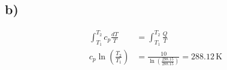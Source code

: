 

\subsection*{b)}

\begin{align*}
\int_{T_1}^{T_2} c_p \frac{dT}{T} &= \int_{T_1}^{T_2} \frac{Q}{T} \\
c_p \ln \left( \frac{T_2}{T_1} \right) &= \frac{10}{\ln \left( \frac{298.15}{288.15} \right)} = 288.12 \, \text{K}
\end{align*}